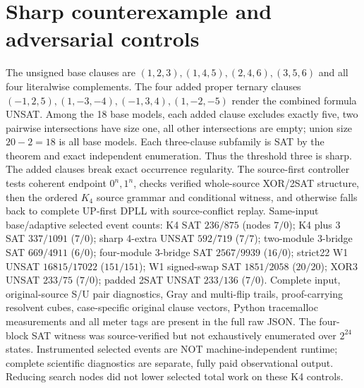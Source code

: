 \documentclass[10pt]{article}
\begin{document}
\section{Sharp counterexample and adversarial controls}
The unsigned base clauses are $(1,2,3),(1,4,5),(2,4,6),(3,5,6)$ and all four literalwise complements. The four added proper ternary clauses $(-1,2,5),(1,-3,-4),(-1,3,4),(1,-2,-5)$ render the combined formula UNSAT. Among the 18 base models, each added clause excludes exactly five, two pairwise intersections have size one, all other intersections are empty; union size $20-2=18$ is all base models. Each three-clause subfamily is SAT by the theorem and exact independent enumeration. Thus the threshold three is sharp. The added clauses break exact occurrence regularity.
The source-first controller tests coherent endpoint $0^n,1^n$, checks verified whole-source XOR/2SAT structure, then the ordered $K_4$ source grammar and conditional witness, and otherwise falls back to complete UP-first DPLL with source-conflict replay. Same-input base/adaptive selected event counts: K4 SAT $236/875$ (nodes $7/0$); K4 plus 3 SAT $337/1091$ ($7/0$); sharp 4-extra UNSAT $592/719$ ($7/7$); two-module 3-bridge SAT $669/4911$ ($6/0$); four-module 3-bridge SAT $2567/9939$ ($16/0$); strict22 W1 UNSAT $16815/17022$ ($151/151$); W1 signed-swap SAT $1851/2058$ ($20/20$); XOR3 UNSAT $233/75$ ($7/0$); padded 2SAT UNSAT $233/136$ ($7/0$). Complete input, original-source S/U pair diagnostics, Gray and multi-flip trails, proof-carrying resolvent cubes, case-specific original clause vectors, Python tracemalloc measurements and all meter tags are present in the full raw JSON. The four-block SAT witness was source-verified but not exhaustively enumerated over $2^{24}$ states. Instrumented selected events are NOT machine-independent runtime; complete scientific diagnostics are separate, fully paid observational output. Reducing search nodes did not lower selected total work on these K4 controls.
\end{document}
